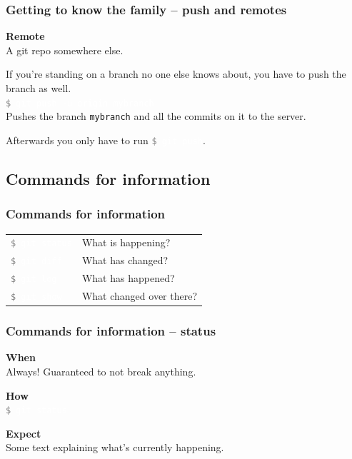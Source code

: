\documentclass{beamer}
\newcommand{\keyword}[1]{\hspace{-1.0em}\textcolor{lkblue}{\textbf{#1}}\vspace{0.2em}} %
\newcommand{\command}[1]{\colorbox{black!78}{\vphantom{Ep}\texttt{\textcolor{gray}{\$}
\textcolor{white}{#1}}}}
\begin{document}
\begin{frame}[fragile]
  \frametitle{Getting to know the family -- push and remotes}
  \keyword{Remote}\\
  A git repo somewhere else. \\
  \vspace{1em}

  If you're standing on a branch no one else knows about, you have
  to push the branch as well. \\
  \vspace{1em}
  \command{git push -u origin mybranch} \\
  \vspace{1em}
  Pushes the branch \texttt{mybranch} and all the
  commits on it to the server.
  \vspace{1em}

  Afterwards you only have to run \command{git push}.

\end{frame}

\subsection{Commands for information}

\begin{frame}[fragile]
  \frametitle{Commands for information}

  \begin{tabular}{ll}
    \command{git status} & What is happening? \\
    \command{git diff} & What has changed? \\
    \command{git log} & What has happened? \\
    \command{git show} & What changed over there? \\
  \end{tabular}

\end{frame}

\begin{frame}
  \frametitle{Commands for information -- status}

  \keyword{When}\\
  Always! Guaranteed to not break anything.
  \vspace{0.5em}

  \keyword{How}\\
  \command{git status}
  \vspace{0.5em}

  \keyword{Expect}\\
  Some text explaining what's currently happening.
\end{frame}
\end{document}
